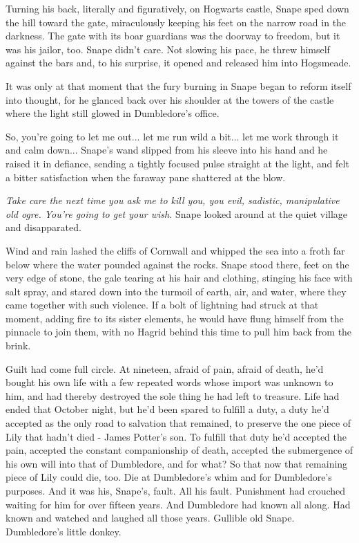 Turning his back, literally and figuratively, on Hogwarts castle, Snape sped down the hill toward the gate, miraculously keeping his feet on the narrow road in the darkness. The gate with its boar guardians was the doorway to freedom, but it was his jailor, too. Snape didn't care. Not slowing his pace, he threw himself against the bars and, to his surprise, it opened and released him into Hogsmeade.

It was only at that moment that the fury burning in Snape began to reform itself into thought, for he glanced back over his shoulder at the towers of the castle where the light still glowed in Dumbledore's office.

So, you're going to let me out... let me run wild a bit... let me work through it and calm down... Snape's wand slipped from his sleeve into his hand and he raised it in defiance, sending a tightly focused pulse straight at the light, and felt a bitter satisfaction when the faraway pane shattered at the blow.

\emph{Take care the next time you ask me to kill you, you evil, sadistic, manipulative old ogre. You're going to get your wish.} Snape looked around at the quiet village and disapparated.

Wind and rain lashed the cliffs of Cornwall and whipped the sea into a froth far below where the water pounded against the rocks. Snape stood there, feet on the very edge of stone, the gale tearing at his hair and clothing, stinging his face with salt spray, and stared down into the turmoil of earth, air, and water, where they came together with such violence. If a bolt of lightning had struck at that moment, adding fire to its sister elements, he would have flung himself from the pinnacle to join them, with no Hagrid behind this time to pull him back from the brink.

Guilt had come full circle. At nineteen, afraid of pain, afraid of death, he'd bought his own life with a few repeated words whose import was unknown to him, and had thereby destroyed the sole thing he had left to treasure. Life had ended that October night, but he'd been spared to fulfill a duty, a duty he'd accepted as the only road to salvation that remained, to preserve the one piece of Lily that hadn't died - James Potter's son. To fulfill that duty he'd accepted the pain, accepted the constant companionship of death, accepted the submergence of his own will into that of Dumbledore, and for what? So that now that remaining piece of Lily could die, too. Die at Dumbledore's whim and for Dumbledore's purposes. And it was his, Snape's, fault. All his fault. Punishment had crouched waiting for him for over fifteen years. And Dumbledore had known all along. Had known and watched and laughed all those years. Gullible old Snape. Dumbledore's little donkey.

